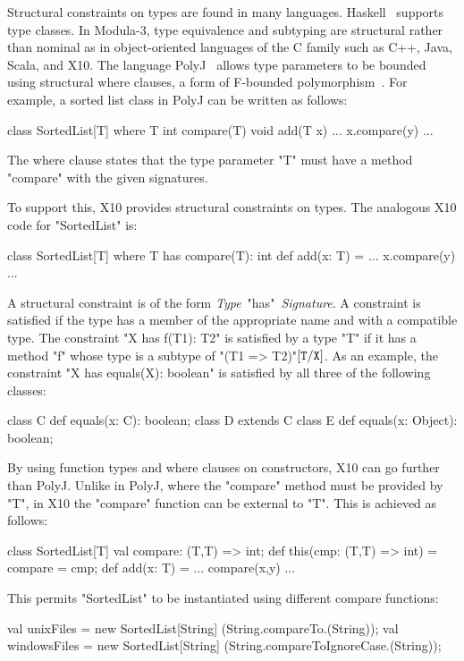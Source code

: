 \documentclass[preprint,nocopyrightspace,9pt]{sigplanconf}
\begin{document}
Structural constraints on types are found in many languages.
Haskell~\cite{haskell} supports type classes.
In Modula-3, type equivalence and subtyping are structural
rather than nominal as in object-oriented languages of the C
family such as C++, Java, Scala, and X10.
%
The language PolyJ~\cite{polyj} allows type parameters to be bounded using
structural where clauses, a form of F-bounded
polymorphism~\cite{fbounds}.
For example, a sorted list class in PolyJ can be written as follows:
\begin{xten}
class SortedList[T] where T { int compare(T) } {
    void add(T x) { ... x.compare(y) ... }
}
\end{xten}
The where clause states that the type parameter \xcd"T" must have a
method \xcd"compare" with the given signatures.

To support this, X10 provides structural constraints on types.
The analogous X10 code for \xcd"SortedList" is:
\begin{xten}
class SortedList[T] where T has compare(T): int {
    def add(x: T) = { ... x.compare(y) ... }
}
\end{xten}

A structural constraint is of the form \emph{Type}~\xcd"has"~\emph{Signature}.
A constraint is satisfied if the type has a member of the appropriate name
and with a compatible type.
The constraint \xcd"X has f(T1): T2"
is satisfied by a type \xcd"T" if it has a method \xcd"f"
whose type is a subtype of \xcd"(T1 => T2)"$[{\tt T}/{\tt X}]$.
As an example,
the constraint \xcd"X has equals(X): boolean"
is satisfied by all three of the following classes:
\begin{xten}
class C { def equals(x: C): boolean; }
class D extends C { }
class E { def equals(x: Object): boolean; }
\end{xten}

By using function types and where clauses on constructors,
X10 can go further than PolyJ.
Unlike in PolyJ, where the \xcd"compare" method must be provided by \xcd"T",
in X10 the \xcd"compare" function can be external to \xcd"T".
This is achieved as follows:
\begin{xten}
class SortedList[T] {
    val compare: (T,T) => int;
    def this(cmp: (T,T) => int) = { compare = cmp; }
    def add(x: T) = { ... compare(x,y) ... }
}
\end{xten}

This permits
\xcd"SortedList" to be instantiated using different compare functions:
\begin{xten}
val unixFiles    = new SortedList[String]
                        (String.compareTo.(String));
val windowsFiles = new SortedList[String]
                        (String.compareToIgnoreCase.(String));
\end{xten}
\end{document}

